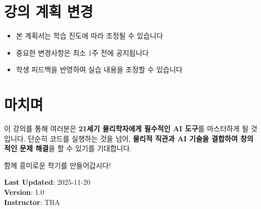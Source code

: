 \documentclass[11pt,a4paper]{article}
\begin{document}
\section{강의 계획 변경}

\begin{itemize}[noitemsep]
    \item 본 계획서는 학습 진도에 따라 조정될 수 있습니다
    \item 중요한 변경사항은 최소 1주 전에 공지됩니다
    \item 학생 피드백을 반영하여 실습 내용을 조정할 수 있습니다
\end{itemize}

\vspace{1cm}

\section*{마치며}

이 강의를 통해 여러분은 \textbf{21세기 물리학자에게 필수적인 AI 도구}를 마스터하게 될 것입니다. 단순히 코드를 실행하는 것을 넘어, \textbf{물리적 직관과 AI 기술을 결합하여 창의적인 문제 해결}을 할 수 있기를 기대합니다.

함께 흥미로운 학기를 만들어갑시다!

\vspace{1cm}

\noindent\textbf{Last Updated}: 2025-11-20\\
\textbf{Version}: 1.0\\
\textbf{Instructor}: TBA
\end{document}
